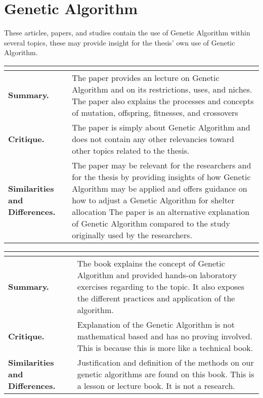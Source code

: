 \section{Genetic Algorithm}

These articles, papers, and studies contain the use of Genetic Algorithm within several topics, these may provide insight for the thesis' own use of Genetic Algorithm.

\begin{longtable}{|L{.2\linewidth}|L{.74\linewidth}|}
	\hline
	\\ \hline
	\textbf{Summary.} & The paper provides an lecture on Genetic Algorithm and on its restrictions, uses, and niches. The paper also explains the processes and concepts of mutation, offspring, fitnesses, and crossovers\\ \hline
	\textbf{Critique.} & The paper is simply about Genetic Algorithm and does not contain any other relevancies toward other topics related to the thesis.\\ \hline
	\textbf{Similarities and Differences.} & The paper may be relevant for the researchers and for the thesis by providing insights of how Genetic Algorithm may be applied and offers guidance on how to adjust a Genetic Algorithm for shelter allocation 	The paper is an alternative explanation of Genetic Algorithm compared to the study originally used by the researchers.\\ \hline
\end{longtable}

\begin{longtable}{|L{.2\linewidth}|L{.74\linewidth}|}
	\hline
	\\ \hline
	\textbf{Summary.} & The book explains the concept of Genetic Algorithm and provided hands-on laboratory exercises regarding to the topic. It also exposes the different practices and application of the algorithm. \\ \hline
	\textbf{Critique.} & Explanation of the Genetic Algorithm is not mathematical based and has no proving involved. This is because this is more like a technical book.\\ \hline
	\textbf{Similarities and Differences.} & Justification and definition of the methods on our genetic algorithms are found on this book.	This is a lesson or lecture book. It is not a research. \\ \hline
\end{longtable}

